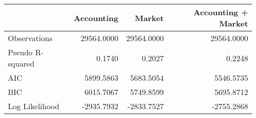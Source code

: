\begin{tabular}{lrrr}
\toprule
 & Accounting & Market & Accounting + Market \\
\midrule
Observations & 29564.0000 & 29564.0000 & 29564.0000 \\
Pseudo R-squared & 0.1740 & 0.2027 & 0.2248 \\
AIC & 5899.5863 & 5683.5054 & 5546.5735 \\
BIC & 6015.7067 & 5749.8599 & 5695.8712 \\
Log Likelihood & -2935.7932 & -2833.7527 & -2755.2868 \\
\bottomrule
\end{tabular}
